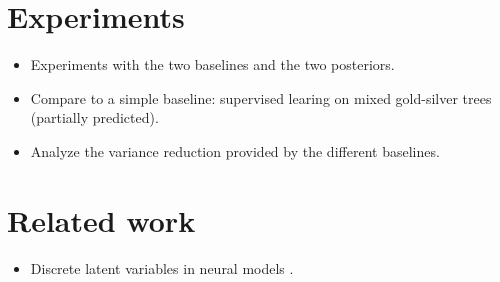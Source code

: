\section{Experiments}
\begin{itemize}
  \item Experiments with the two baselines and the two posteriors.
  \item Compare to a simple baseline: supervised learing on mixed gold-silver trees (partially predicted).
  \item Analyze the variance reduction provided by the different baselines.
\end{itemize}


\section{Related work}
\begin{itemize}
  \item Discrete latent variables in neural models \citep{Miao+2016,yin2018structvae}.
\end{itemize}
